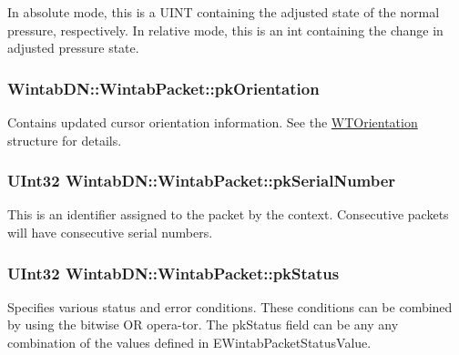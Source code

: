 In absolute mode, this is a UINT containing the adjusted state of the normal pressure, respectively. In relative mode, this is an int containing the change in adjusted pressure state. 

\hypertarget{struct_wintab_d_n_1_1_wintab_packet_a75a992e71d4c430f5eb5211e19ca1b32}{
\subsubsection[{pkOrientation}]{ {\bf WintabDN::WintabPacket::pkOrientation}}}
\label{struct_wintab_d_n_1_1_wintab_packet_a75a992e71d4c430f5eb5211e19ca1b32}


Contains updated cursor orientation information. See the \hyperlink{struct_wintab_d_n_1_1_w_t_orientation}{WTOrientation} structure for details. 

\hypertarget{struct_wintab_d_n_1_1_wintab_packet_a10550807dd2a1cd432c2ff3c271bd3ea}{
\subsubsection[{pkSerialNumber}]{\setlength{\rightskip}{0pt plus 5cm}UInt32 {\bf WintabDN::WintabPacket::pkSerialNumber}}}
\label{struct_wintab_d_n_1_1_wintab_packet_a10550807dd2a1cd432c2ff3c271bd3ea}


This is an identifier assigned to the packet by the context. Consecutive packets will have consecutive serial numbers. 

\hypertarget{struct_wintab_d_n_1_1_wintab_packet_a2f16f395c9f61bd40038a1029ec62912}{
\subsubsection[{pkStatus}]{\setlength{\rightskip}{0pt plus 5cm}UInt32 {\bf WintabDN::WintabPacket::pkStatus}}}
\label{struct_wintab_d_n_1_1_wintab_packet_a2f16f395c9f61bd40038a1029ec62912}


Specifies various status and error conditions. These conditions can be combined by using the bitwise OR opera-\/tor. The pkStatus field can be any any combination of the values defined in EWintabPacketStatusValue. 

